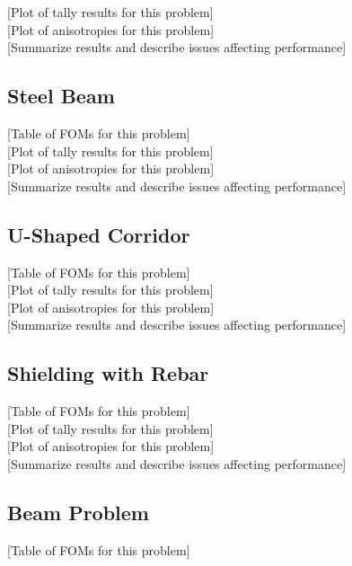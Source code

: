 [Plot of tally results for this problem]\\

[Plot of anisotropies for this problem] \\

[Summarize results and describe issues affecting performance] \\

\subsection{Steel Beam}
\label{subsec:resultbeam}
[Table of FOMs for this problem] \\

[Plot of tally results for this problem] \\

[Plot of anisotropies for this problem] \\

[Summarize results and describe issues affecting performance] \\

\subsection{U-Shaped Corridor}
\label{subsec:resultsucorridor}
[Table of FOMs for this problem] \\

[Plot of tally results for this problem] \\

[Plot of anisotropies for this problem] \\

[Summarize results and describe issues affecting performance] \\

\subsection{Shielding with Rebar}
\label{subsec:resultrebar}
[Table of FOMs for this problem] \\

[Plot of tally results for this problem] \\

[Plot of anisotropies for this problem] \\

[Summarize results and describe issues affecting performance] \\

\subsection{Beam Problem}
\label{subsec:resultsbeam}
[Table of FOMs for this problem] \\

